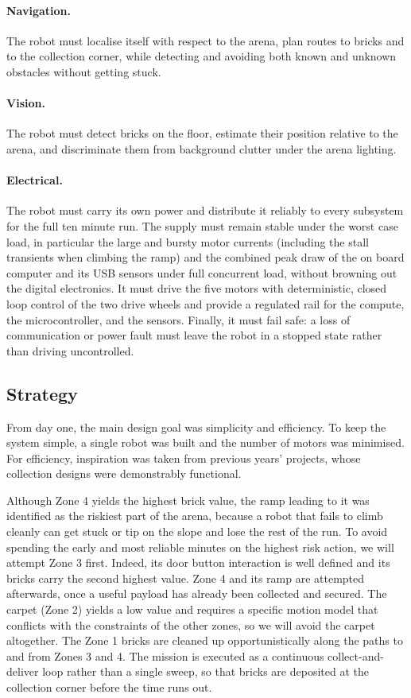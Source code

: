 \documentclass[11pt]{article}
\begin{document}
\paragraph{Navigation.} The robot must localise itself with respect to the arena, plan routes to bricks and to the collection corner, while detecting and avoiding both known and unknown obstacles without getting stuck.

\paragraph{Vision.} The robot must detect bricks on the floor, estimate their position relative to the arena, and discriminate them from background clutter under the arena lighting.

\paragraph{Electrical.} The robot must carry its own power and distribute it reliably to every subsystem for the full ten minute run. The supply must remain stable under the worst case load, in particular the large and bursty motor currents (including the stall transients when climbing the ramp) and the combined peak draw of the on board computer and its USB sensors under full concurrent load, without browning out the digital electronics. It must drive the five motors with deterministic, closed loop control of the two drive wheels and provide a regulated rail for the compute, the microcontroller, and the sensors. Finally, it must fail safe: a loss of communication or power fault must leave the robot in a stopped state rather than driving uncontrolled.

\subsection{Strategy}
From day one, the main design goal was simplicity and efficiency. To keep the system simple, a single robot was built and the number of motors was minimised. For efficiency, inspiration was taken from previous years' projects, whose collection designs were demonstrably functional.

Although Zone 4 yields the highest brick value, the ramp leading to it was identified as the riskiest part of the arena, because a robot that fails to climb cleanly can get stuck or tip on the slope and lose the rest of the run. To avoid spending the early and most reliable minutes on the highest risk action, we will attempt Zone 3 first. Indeed, its door button interaction is well defined and its bricks carry the second highest value. Zone 4 and its ramp are attempted afterwards, once a useful payload has already been collected and secured. The carpet (Zone 2) yields a low value and requires a specific motion model that conflicts with the constraints of the other zones, so we will avoid the carpet altogether. The Zone 1 bricks are cleaned up opportunistically along the paths to and from Zones 3 and 4. The mission is executed as a continuous collect-and-deliver loop rather than a single sweep, so that bricks are deposited at the collection corner before the time runs out.
\end{document}
